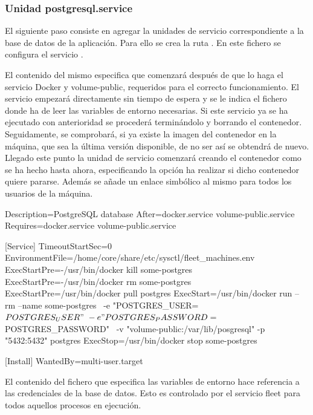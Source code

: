 \subsubsection{Unidad postgresql.service}

El siguiente paso consiste en agregar la unidades de servicio correspondiente a la base de datos de la aplicación. Para ello  se crea la ruta . En este fichero se configura el servicio .

El contenido del mismo especifica que comenzará después de que lo haga el servicio Docker y volume-public, requeridos para el correcto funcionamiento. El servicio empezará directamente sin tiempo de espera y se le indica el fichero donde ha de leer las variables de entorno necesarias. Si este servicio ya se ha ejecutado con anterioridad se procederá terminándolo y borrando el contenedor. Seguidamente, se comprobará, si ya existe la imagen del contenedor en la máquina, que sea la última versión disponible, de no ser así se obtendrá de nuevo. Llegado este punto la unidad de servicio comenzará creando el contenedor como se ha hecho hasta ahora, especificando la opción ha realizar si dicho contenedor quiere pararse. Además se añade un enlace simbólico al mismo para todos los usuarios de la máquina. 

\begin{codelisting}
\label{code:postgresql.service}
\begin{code}
[Unit] 
  Description=PostgreSQL database 
  After=docker.service volume-public.service
  Requires=docker.service volume-public.service

[Service] 
  TimeoutStartSec=0
  EnvironmentFile=/home/core/share/etc/sysctl/fleet_machines.env
  ExecStartPre=-/usr/bin/docker kill some-postgres 
  ExecStartPre=-/usr/bin/docker rm some-postgres 
  ExecStartPre=/usr/bin/docker pull postgres 
  ExecStart=/usr/bin/docker run --rm --name some-postgres \
  -e "POSTGRES_USER=${POSTGRES_USER}" \
  -e "POSTGRES_PASSWORD=${POSTGRES_PASSWORD}" \
  -v "volume-public:/var/lib/posgresql" -p "5432:5432" postgres 
  ExecStop=/usr/bin/docker stop some-postgres 

[Install] 
  WantedBy=multi-user.target
\end{code}
\end{codelisting}

El contenido del fichero que especifica las variables de entorno hace referencia a las credenciales de la base de datos. Esto es controlado por el servicio fleet para todos aquellos procesos en ejecución.

